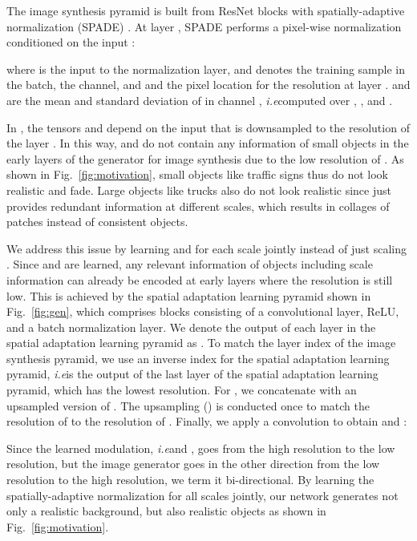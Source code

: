 \documentclass{bmvc2k}
\newcommand{\figref}[1]{Fig.~\ref{#1}}
\def\ie{\emph{i.e}\bmvaOneDot}
\begin{document}
The image synthesis pyramid is built from ResNet blocks \cite{he2016deep} with spatially-adaptive normalization (SPADE) \cite{park2019semantic}. At layer , SPADE performs a pixel-wise normalization conditioned on the input :

where  is the input to the normalization layer, and  denotes the training sample in the batch,  the channel, and  and  the pixel location for the resolution at layer .  and  are the mean and standard deviation of  in channel , \ie computed over , , and . 

In \cite{park2019semantic,schonfeld_sushko_iclr2021}, the tensors  and  depend on the input  that is downsampled to the resolution of the layer . In this way,  and  do not contain any information of small objects in the early layers of the generator for image synthesis due to the low resolution of . As shown in \figref{fig:motivation}, small objects like traffic signs thus do not look realistic and fade. Large objects like trucks also do not look realistic since  just provides redundant information at different scales, which results in collages of patches instead of consistent objects.     

We address this issue by learning  and  for each scale jointly instead of just scaling . Since  and  are learned, any relevant information of objects including scale information can already be encoded at early layers where the resolution is still low. This is achieved by the spatial adaptation learning pyramid shown in \figref{fig:gen}, which comprises blocks consisting of a convolutional layer, ReLU, and a batch normalization layer. We denote the output of each layer in the spatial adaptation learning pyramid as . To match the layer index of the image synthesis pyramid, we use an inverse index  for the spatial adaptation learning pyramid, \ie  is the output of the last layer of the spatial adaptation learning pyramid,  which has the lowest resolution. For , we concatenate  with an upsampled version of . The upsampling () is conducted once to match the resolution of  to the resolution of . Finally, we apply a convolution to obtain  and :

Since the learned modulation, \ie and , goes from the high resolution
to the low resolution, but the image generator goes in the
other direction from the low resolution to the high resolution,
we term it bi-directional. By learning the spatially-adaptive normalization for all scales jointly, our network generates not only a realistic background, but also realistic objects as shown in \figref{fig:motivation}.
\end{document}
